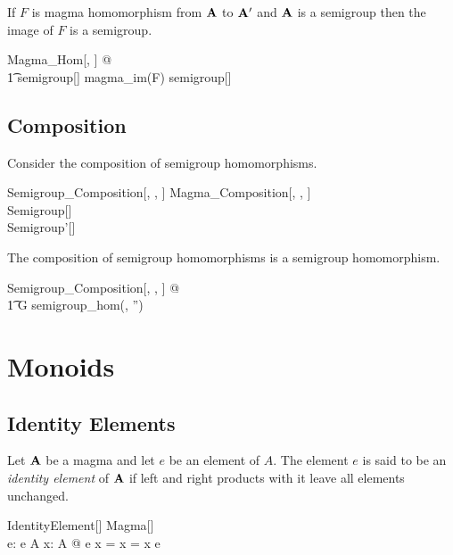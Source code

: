 \documentclass{amsart}
\begin{document}
\begin{remark}
If $F$ is magma homomorphism from $\mathbf{A}$ to $\mathbf{A}'$ and $\mathbf{A}$ is a semigroup
then the image of $F$ is a semigroup.

\begin{zed}
	\forall Magma\_Hom[\setT, \setU] @ \\
	\t1	\strucA \in semigroup[\setT] \implies magma\_im(F) \in semigroup[\setU]
\end{zed}

\end{remark}

\subsection{Composition}

Consider the composition of semigroup homomorphisms.

\begin{schema}{Semigroup\_Composition}[\genT, \genU, \genV]
	Magma\_Composition[\genT, \genU, \genV] \\
	Semigroup[\genT] \\
	Semigroup'[\genU]
\end{schema}

\begin{remark}
The composition of semigroup homomorphisms is a semigroup homomorphism.

\begin{zed}
	\forall Semigroup\_Composition[\setT, \setU, \setV] @ \\
	\t1	G \in semigroup\_hom(\strucA, \strucA'')
\end{zed}

\end{remark}

\section{Monoids}

\subsection{Identity Elements}

Let $\mathbf{A}$ be a magma and let $e$ be an element of $A$.
The element $e$ is said to be an \textit{identity element} of $\mathbf{A}$ if left and right 
products with it leave all elements unchanged.

\begin{schema}{IdentityElement}[\genT]
	Magma[\genT] \\
	e: \genT
\where
	e \in A
\also
	\forall x: A @ e \opG x = x = x \opG e
\end{schema}
\end{document}
